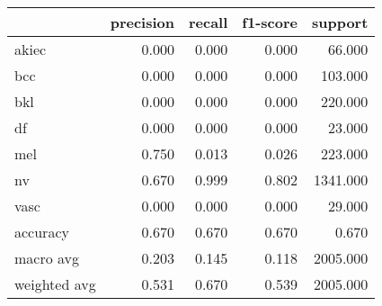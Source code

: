 \begin{tabular}{lrrrr}
\toprule
 & precision & recall & f1-score & support \\
\midrule
akiec & 0.000 & 0.000 & 0.000 & 66.000 \\
bcc & 0.000 & 0.000 & 0.000 & 103.000 \\
bkl & 0.000 & 0.000 & 0.000 & 220.000 \\
df & 0.000 & 0.000 & 0.000 & 23.000 \\
mel & 0.750 & 0.013 & 0.026 & 223.000 \\
nv & 0.670 & 0.999 & 0.802 & 1341.000 \\
vasc & 0.000 & 0.000 & 0.000 & 29.000 \\
accuracy & 0.670 & 0.670 & 0.670 & 0.670 \\
macro avg & 0.203 & 0.145 & 0.118 & 2005.000 \\
weighted avg & 0.531 & 0.670 & 0.539 & 2005.000 \\
\bottomrule
\end{tabular}
